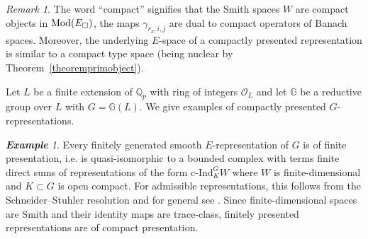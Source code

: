 \documentclass[a4paper,10pt]{amsart}
\theoremstyle{remark}
\newtheorem{example}[theorem]{\bf Example}
\newtheorem{remark}[theorem]{Remark}
\theoremstyle{definition}
\theoremstyle{plain}
\numberwithin{equation}{section}
\newcommand{\bbG}{{\mathbb G}}
\newcommand{\bbQ}{{\mathbb Q}}
\newcommand{\calO}{{\mathcal O}}
\newcommand{\Mod}{{\rm Mod}}
\newcommand{\cInd}{\mathrm{c\text{-}Ind}}
\begin{document}
\begin{remark}
	The word ``compact'' signifies that the Smith spaces $W$ are compact objects in $\Mod(E_{\square})$, the maps $\gamma_{r_k,i,j}$ are dual to compact operators of Banach spaces. Moreover, the underlying $E$-space of a compactly presented representation is similar to a compact type space (being nuclear by Theorem~\ref{theoremprimobject}).
\end{remark}
Let $L$ be a finite extension of $\bbQ_p$ with ring of integers $\calO_L$ and let $\bbG$ be a reductive group over $L$ with $G=\bbG(L)$. We give examples of compactly presented $G$-representations.
\begin{example}\label{rem:smooth-finite-presentation}
 Every finitely generated smooth $E$-representation of $G$ is of finite
presentation, i.e. is quasi-isomorphic to a bounded complex with terms finite direct sums of representations of the form $\cInd_{K}^GW$ where $W$ is finite-dimensional and $K\subset G$ is open compact. For admissible representations, this follows from the
Schneider--Stuhler resolution
\cite[Prop.~II.2.1, Thm~II.3.1]
{schneiderStuhler1997representation} and for general see \cite[Cor.~1.4]{bartelsLuck2023algebraic}. Since finite-dimensional spaces are Smith and their identity maps are trace-class, finitely presented representations are of compact presentation.
\end{example}
\end{document}
